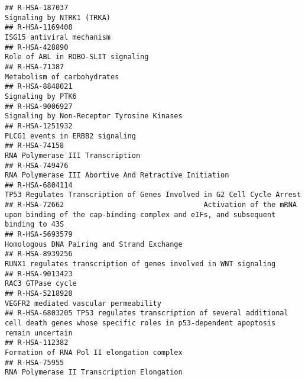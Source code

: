 \documentclass[
]{article}
\begin{document}
\begin{verbatim}
## R-HSA-187037                                                                                                             Signaling by NTRK1 (TRKA)
## R-HSA-1169408                                                                                                            ISG15 antiviral mechanism
## R-HSA-428890                                                                                                    Role of ABL in ROBO-SLIT signaling
## R-HSA-71387                                                                                                            Metabolism of carbohydrates
## R-HSA-8848021                                                                                                                    Signaling by PTK6
## R-HSA-9006927                                                                                           Signaling by Non-Receptor Tyrosine Kinases
## R-HSA-1251932                                                                                                      PLCG1 events in ERBB2 signaling
## R-HSA-74158                                                                                                       RNA Polymerase III Transcription
## R-HSA-749476                                                                                 RNA Polymerase III Abortive And Retractive Initiation
## R-HSA-6804114                                                               TP53 Regulates Transcription of Genes Involved in G2 Cell Cycle Arrest
## R-HSA-72662                                 Activation of the mRNA upon binding of the cap-binding complex and eIFs, and subsequent binding to 43S
## R-HSA-5693579                                                                                           Homologous DNA Pairing and Strand Exchange
## R-HSA-8939256                                                                     RUNX1 regulates transcription of genes involved in WNT signaling
## R-HSA-9013423                                                                                                                    RAC3 GTPase cycle
## R-HSA-5218920                                                                                                VEGFR2 mediated vascular permeability
## R-HSA-6803205 TP53 regulates transcription of several additional cell death genes whose specific roles in p53-dependent apoptosis remain uncertain
## R-HSA-112382                                                                                           Formation of RNA Pol II elongation complex 
## R-HSA-75955                                                                                             RNA Polymerase II Transcription Elongation

\end{verbatim}
\end{document}
